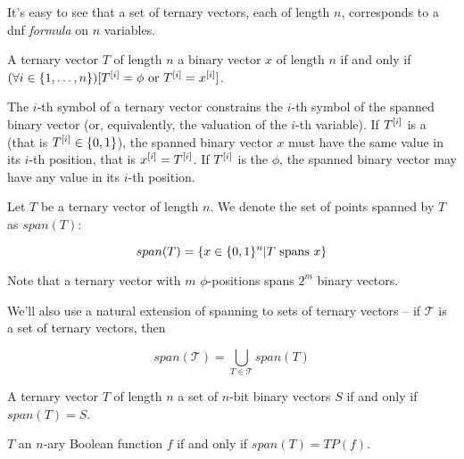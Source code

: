 It's easy to see that a set of ternary vectors,
each of length $n$,
corresponds to a \acrshort{dnf} \emph{formula}
on $n$ variables.

\begin{definition}
A ternary vector $T$ of length $n$ 
a binary vector $x$ of length $n$
if and only if
$(\forall i \in \{1, \ldots, n\}) [T^{[i]} = \phi \text{ or } T^{[i]} = x^{[i]}]$.
\end{definition}

The $i$-th symbol of a ternary vector
constrains the $i$-th symbol of the spanned binary vector
(or, equivalently, the valuation of the $i$-th variable).
If $T^{[i]}$ is a 
(that is $T^{[i]} \in \{0, 1\}$),
the spanned binary vector $x$
must have the same value
in its $i$-th position,
that is $x^{[i]} = T^{[i]}$.
If $T^{[i]}$ is the  $\phi$,
the spanned binary vector
may have any value in its $i$-th position.


\begin{definition}
Let $T$ be a ternary vector of length $n$.
We denote the set of points spanned by $T$
as $span(T)$:

\begin{equation*}
span(T) = \{
x \in \{0, 1\}^n |
T\text{ spans }x
\}
\end{equation*}
\end{definition}

Note that a ternary vector
with $m$ $\phi$-positions
spans $2^m$ binary vectors.

We'll also use a natural extension of spanning
to sets of ternary vectors --
if $\mathcal{T}$ is a set of ternary vectors, then

\begin{equation*}
span(\mathcal{T}) =
\bigcup_{T \in \mathcal{T}} span(T)
\end{equation*}

\begin{definition}
A ternary vector $T$ of length $n$
a set of $n$-bit binary vectors $S$
if and only if
$span(T) = S$.

$T$ 
an $n$-ary Boolean function $f$
if and only if
$span(T) = TP(f)$.
\end{definition}

